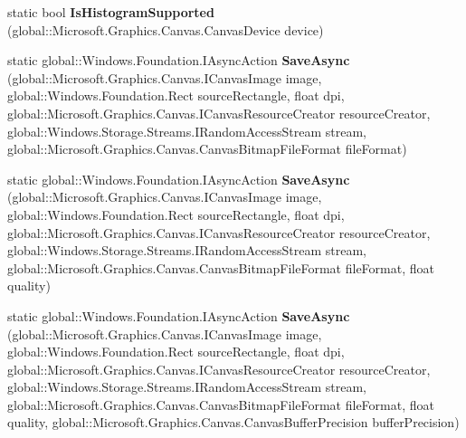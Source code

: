 \begin{DoxyCompactItemize}
\item 
\mbox{\label{class_microsoft_1_1_graphics_1_1_canvas_1_1_canvas_image_aff3e5210428f12ae587c08a1c3b26c85}} 
static bool {\bfseries Is\+Histogram\+Supported} (global\+::\+Microsoft.\+Graphics.\+Canvas.\+Canvas\+Device device)
\item 
\mbox{\label{class_microsoft_1_1_graphics_1_1_canvas_1_1_canvas_image_a30ada8b24e212bcbdc24f994e66ad191}} 
static global\+::\+Windows.\+Foundation.\+I\+Async\+Action {\bfseries Save\+Async} (global\+::\+Microsoft.\+Graphics.\+Canvas.\+I\+Canvas\+Image image, global\+::\+Windows.\+Foundation.\+Rect source\+Rectangle, float dpi, global\+::\+Microsoft.\+Graphics.\+Canvas.\+I\+Canvas\+Resource\+Creator resource\+Creator, global\+::\+Windows.\+Storage.\+Streams.\+I\+Random\+Access\+Stream stream, global\+::\+Microsoft.\+Graphics.\+Canvas.\+Canvas\+Bitmap\+File\+Format file\+Format)
\item 
\mbox{\label{class_microsoft_1_1_graphics_1_1_canvas_1_1_canvas_image_a84ddbc832a47bc0660a10d09a095ae1e}} 
static global\+::\+Windows.\+Foundation.\+I\+Async\+Action {\bfseries Save\+Async} (global\+::\+Microsoft.\+Graphics.\+Canvas.\+I\+Canvas\+Image image, global\+::\+Windows.\+Foundation.\+Rect source\+Rectangle, float dpi, global\+::\+Microsoft.\+Graphics.\+Canvas.\+I\+Canvas\+Resource\+Creator resource\+Creator, global\+::\+Windows.\+Storage.\+Streams.\+I\+Random\+Access\+Stream stream, global\+::\+Microsoft.\+Graphics.\+Canvas.\+Canvas\+Bitmap\+File\+Format file\+Format, float quality)
\item 
\mbox{\label{class_microsoft_1_1_graphics_1_1_canvas_1_1_canvas_image_a762e42f02f39504e92616098985cf683}} 
static global\+::\+Windows.\+Foundation.\+I\+Async\+Action {\bfseries Save\+Async} (global\+::\+Microsoft.\+Graphics.\+Canvas.\+I\+Canvas\+Image image, global\+::\+Windows.\+Foundation.\+Rect source\+Rectangle, float dpi, global\+::\+Microsoft.\+Graphics.\+Canvas.\+I\+Canvas\+Resource\+Creator resource\+Creator, global\+::\+Windows.\+Storage.\+Streams.\+I\+Random\+Access\+Stream stream, global\+::\+Microsoft.\+Graphics.\+Canvas.\+Canvas\+Bitmap\+File\+Format file\+Format, float quality, global\+::\+Microsoft.\+Graphics.\+Canvas.\+Canvas\+Buffer\+Precision buffer\+Precision)

\end{DoxyCompactItemize}
